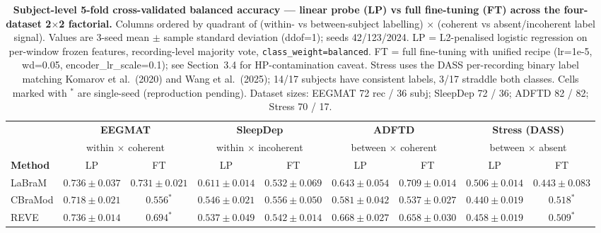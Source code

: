 \documentclass[10pt]{article}
\begin{document}
\begin{table}[htbp]
\centering
\footnotesize
\caption{\textbf{Subject-level 5-fold cross-validated balanced accuracy — linear probe (LP) vs full fine-tuning (FT) across the four-dataset 2$\times$2 factorial.}
Columns ordered by quadrant of (within- vs between-subject labelling) $\times$ (coherent vs absent/incoherent label signal).
Values are 3-seed mean $\pm$ sample standard deviation (ddof=1); seeds 42/123/2024.
LP = L2-penalised logistic regression on per-window frozen features, recording-level majority vote, \texttt{class\_weight=balanced}.
FT = full fine-tuning with unified recipe (lr=1e-5, wd=0.05, encoder\_lr\_scale=0.1); see Section~3.4 for HP-contamination caveat.
Stress uses the DASS per-recording binary label matching Komarov et al.\ (2020) and Wang et al.\ (2025); 14/17 subjects have consistent labels, 3/17 straddle both classes.
Cells marked with ${}^{*}$ are single-seed (reproduction pending).
Dataset sizes: EEGMAT 72 rec / 36 subj; SleepDep 72 / 36; ADFTD 82 / 82; Stress 70 / 17.}
\label{tab:master_performance}

\begin{tabular}{l cc cc cc cc}
\toprule
 & \multicolumn{2}{c}{\textbf{EEGMAT}} & \multicolumn{2}{c}{\textbf{SleepDep}} & \multicolumn{2}{c}{\textbf{ADFTD}} & \multicolumn{2}{c}{\textbf{Stress (DASS)}} \\
 & \multicolumn{2}{c}{\footnotesize within $\times$ coherent} & \multicolumn{2}{c}{\footnotesize within $\times$ incoherent} & \multicolumn{2}{c}{\footnotesize between $\times$ coherent} & \multicolumn{2}{c}{\footnotesize between $\times$ absent} \\
\cmidrule(lr){2-3} \cmidrule(lr){4-5} \cmidrule(lr){6-7} \cmidrule(lr){8-9}
\textbf{Method} & LP & FT & LP & FT & LP & FT & LP & FT \\
\midrule
LaBraM & $0.736 \pm 0.037$ & $0.731 \pm 0.021$ & $0.611 \pm 0.014$ & $0.532 \pm 0.069$ & $0.643 \pm 0.054$ & $0.709 \pm 0.014$ & $0.506 \pm 0.014$ & $0.443 \pm 0.083$ \\
CBraMod & $0.718 \pm 0.021$ & $0.556^{*}$ & $0.546 \pm 0.021$ & $0.556 \pm 0.050$ & $0.581 \pm 0.042$ & $0.537 \pm 0.027$ & $0.440 \pm 0.019$ & $0.518^{*}$ \\
REVE & $0.736 \pm 0.014$ & $0.694^{*}$ & $0.537 \pm 0.049$ & $0.542 \pm 0.014$ & $0.668 \pm 0.027$ & $0.658 \pm 0.030$ & $0.458 \pm 0.019$ & $0.509^{*}$ \\
\bottomrule
\end{tabular}
\end{table}
\end{document}
